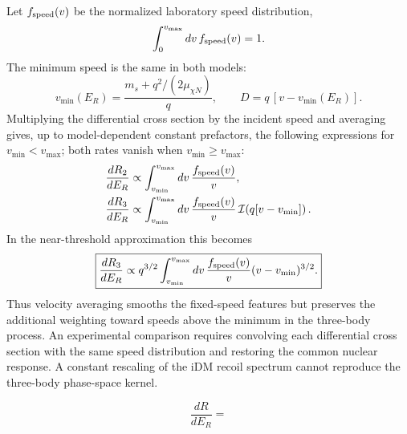 \documentclass[prd,showpacs,preprintnumbers,amsmath,amssymb,twocolumn,
superscriptaddress,notitlepage]{revtex4-2}
\begin{document}
Let $f_{\rm speed}(v)$ be the normalized laboratory speed distribution,
\begin{equation}
\int_0^{v_{\max}}dv\,f_{\rm speed}(v)=1.
\end{equation}
The minimum speed is the same in both models:
\begin{equation}
v_{\min}(E_R)
=\frac{m_s+q^2/(2\mu_{\chi N})}{q},\qquad
D=q\,[v-v_{\min}(E_R)].
\label{eq:phase-vmin}
\end{equation}
Multiplying the differential cross section by the incident speed
and averaging gives, up to model-dependent constant prefactors,
the following expressions for $v_{\min}<v_{\max}$; both rates vanish
when $v_{\min}\geq v_{\max}$:
\begin{align}
\frac{dR_2}{dE_R}
&\propto
\int_{v_{\min}}^{v_{\max}}
dv\,\frac{f_{\rm speed}(v)}{v},\\
\frac{dR_3}{dE_R}
&\propto
\int_{v_{\min}}^{v_{\max}}
dv\,\frac{f_{\rm speed}(v)}{v}\,
\mathcal{I}\!\left(q[v-v_{\min}]\right).
\label{eq:phase-halo-exact-scalar}
\end{align}
In the near-threshold approximation this becomes
\begin{equation}
\boxed{
\frac{dR_3}{dE_R}
\propto q^{3/2}
\int_{v_{\min}}^{v_{\max}}
dv\,\frac{f_{\rm speed}(v)}{v}
(v-v_{\min})^{3/2}.
}
\label{eq:phase-halo-threshold}
\end{equation}
Thus velocity averaging smooths the fixed-speed features but preserves
the additional weighting toward speeds above the minimum in the
three-body process. An experimental comparison requires convolving each
differential cross section with the same speed distribution and
restoring the common nuclear response. A constant rescaling of the
iDM recoil spectrum cannot reproduce the three-body phase-space kernel.

\begin{equation}
\frac{d R}{d E_R} = 
\end{equation}
\end{document}
